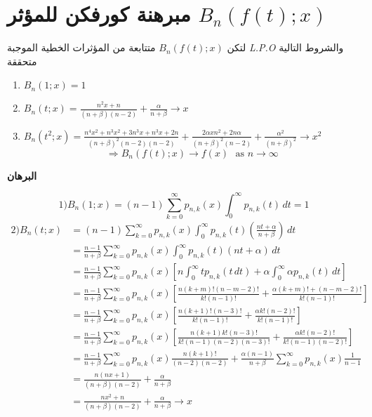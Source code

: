 \newpage
\section{مبرهنة كورفكن للمؤثر $B_n(f(t); x)$}
لتكن $B_n(f(t);x)$ متتابعة من المؤثرات الخطية الموجبة \textit{L.P.O} والشروط التالية متحققة 
\begin{english}
	\begin{enumerate}[label=\arabic*)]
		\item $B_n(1; x) =1$
		\item $B_n(t; x) = \frac{n^2x + n}{(n+ \beta)(n-2)} + \frac{\alpha}{n + \beta} \to x$
		\item $B_n(t^2; x) = \frac{n^4x^2 + n^3x^2 + 3n^3x + n^3 x + 2n}{(n+\beta)^2 (n-2)(n-2)} + \frac{2\alpha x n^2 + 2n \alpha}{(n+\beta)^2 (n-2)} + \frac{\alpha^2 }{(n+\beta)^2} \to x^2$
		\[
		\Rightarrow B_n(f(t); x) \to f(x)\,\, \text{ as $n \to \infty$}
		\]
	\end{enumerate}
\end{english}
\noindent
\textbf{{البرهان}}	

\noindent
\[
1) B_n(1; x) = (n-1) \sum_{k=0}^{\infty} p_{n, k}(x) \int_{0}^{\infty} p_{n, k}(t) \, dt = 1
\]
\begin{align*}
	2) B_n(t; x) &= (n-1) \sum_{k=0}^{\infty} p_{n, k}(x) \int_{0}^{\infty} p_{n, k}(t) \left(\frac{nt+\alpha}{n + \beta}\right)\, dt \\
	&= \frac{n-1}{n+\beta} \sum_{k=0}^{\infty} p_{n, k}(x) \int_{0}^{\infty} p_{n, k}(t) (nt + \alpha) \, dt\\
	&= \frac{n-1}{n+\beta} \sum_{k=0}^{\infty} p_{n, k}(x) \left[n\int_{0}^{\infty} t p_{n, k}(t\, dt) + \alpha \int_{0}^{\infty} \alpha p_{n,k}(t)\, dt\right]\\
	&= \frac{n-1}{n+\beta} \sum_{k=0}^{\infty} p_{n, k}(x) \left[\textstyle
	\frac{n(k+m)!(n-m-2)!}{k!(n-1)!} + \frac{\alpha(k+m)! + (n-m-2)!}{k!(n-1)!}
	\right]\\
	&= \frac{n-1}{n+\beta} \sum_{k=0}^{\infty} p_{n, k}(x) \left[\textstyle
	\frac{n(k+1)! (n-3)!}{k!(n-1)!} + \frac{\alpha k!(n-2)!}{k!(n-1)!}
	\right]\\
	&= \frac{n-1}{n+\beta} \sum_{k=0}^{\infty} p_{n, k}(x) \left[\textstyle
	\frac{n(k+1)k!(n-3)!}{k!(n-1)(n-2)(n-3)!} + \frac{\alpha k! (n-2)!}{k! (n-1)(n-2)!}
	\right]\\
	&= \frac{n-1}{n+\beta} \sum_{k=0}^{\infty} p_{n, k}(x) \frac{n(k+1)!}{(n-2)(n-2)} + \frac{\alpha(n-1)}{n+\beta} \sum_{k=0}^{\infty} p_{n, k}(x) \frac{1}{n-1}\\
	&= \frac{n(nx + 1)}{(n+\beta)(n-2)} + \frac{\alpha}{n + \beta}\\
	&= \frac{nx^2 + n}{(n+\beta)(n-2)} + \frac{\alpha}{n + \beta} \to x
\end{align*}

